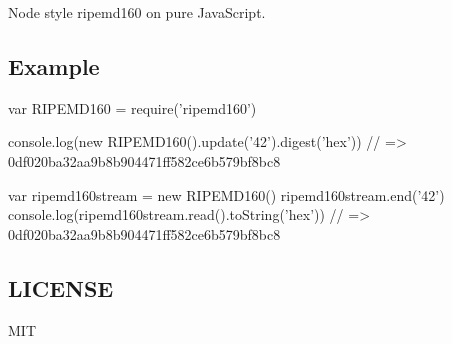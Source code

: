 \href{https://www.npmjs.org/package/ripemd160}{\tt } \href{https://travis-ci.org/crypto-browserify/ripemd160}{\tt } \href{https://david-dm.org/crypto-browserify/ripemd160#info=dependencies}{\tt }

\href{https://github.com/feross/standard}{\tt }

Node style {\ttfamily ripemd160} on pure Java\+Script.

\subsection*{Example}


\begin{DoxyCode}
var RIPEMD160 = require('ripemd160')

console.log(new RIPEMD160().update('42').digest('hex'))
// => 0df020ba32aa9b8b904471ff582ce6b579bf8bc8

var ripemd160stream = new RIPEMD160()
ripemd160stream.end('42')
console.log(ripemd160stream.read().toString('hex'))
// => 0df020ba32aa9b8b904471ff582ce6b579bf8bc8
\end{DoxyCode}


\subsection*{L\+I\+C\+E\+N\+SE}

M\+IT 